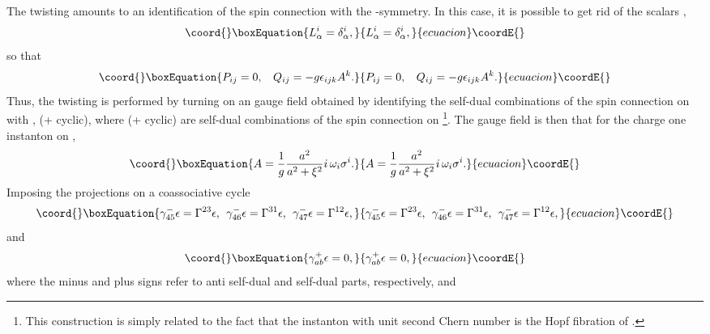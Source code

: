 \documentclass[12pt,a4paper]{article}
\begin{document}
The twisting amounts to an identification of the spin connection with the \coordHE{}-symmetry. In this case, 
it is possible to get rid of the scalars \coordHE{},
\begin{equation}\coord{}\boxEquation{
L^{i}_{\alpha} = \delta_{\alpha}^{i},
\label{10}
}{
L^{i}_{\alpha} = \delta_{\alpha}^{i},
}{ecuacion}\coordE{}\end{equation}
so that
\begin{equation}\coord{}\boxEquation{
P_{ij} = 0, \: \: \: \: Q_{ij} = - g \epsilon_{ijk} A^k.
\label{11}
}{
P_{ij} = 0, \: \: \: \: Q_{ij} = - g \epsilon_{ijk} A^k.
}{ecuacion}\coordE{}\end{equation}
Thus, the twisting is performed by turning on an \coordHE{} gauge field obtained by identifying the self-dual 
combinations of the spin connection on \coordHE{} with \coordHE{}, 
\coordHE{} (+ cyclic), where 
\coordHE{} (+ cyclic) are self-dual combinations of the spin 
connection on \coordHE{} \footnote{This construction is simply related to the fact that the instanton with 
unit second Chern number is the Hopf fibration of \coordHE{}.}. The gauge field is then that 
for the charge one \coordHE{} instanton on \coordHE{},
\begin{equation}\coord{}\boxEquation{
A = \frac {1}{g} \frac {a^2}{a^2 + \xi^2} i \, \omega_i \sigma^{i}.
\label{13}
}{
A = \frac {1}{g} \frac {a^2}{a^2 + \xi^2} i \, \omega_i \sigma^{i}.
}{ecuacion}\coordE{}\end{equation}
Imposing the projections on a coassociative cycle \cite{GLW}
\begin{equation}\coord{}\boxEquation{
\gamma_{45}^- \epsilon = \Gamma^{23} \epsilon, \: \: \gamma_{46}^- \epsilon =
\Gamma^{31} \epsilon, \: \: \gamma_{47}^- \epsilon = \Gamma^{12} \epsilon,
\label{14}
}{
\gamma_{45}^- \epsilon = \Gamma^{23} \epsilon, \: \: \gamma_{46}^- \epsilon =
\Gamma^{31} \epsilon, \: \: \gamma_{47}^- \epsilon = \Gamma^{12} \epsilon,
}{ecuacion}\coordE{}\end{equation}
and 
\begin{equation}\coord{}\boxEquation{
\gamma_{ab}^+ \epsilon = 0,
\label{15}
}{
\gamma_{ab}^+ \epsilon = 0,
}{ecuacion}\coordE{}\end{equation}
where the minus and plus signs refer to anti self-dual and self-dual parts, respectively, and 
\end{document}
